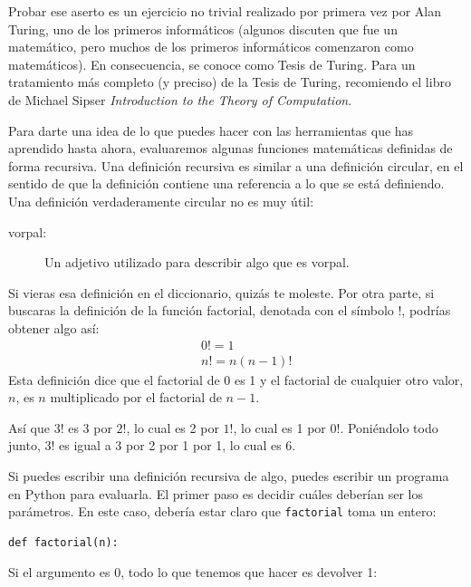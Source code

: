\documentclass[10pt]{book}
\begin{document}
Probar ese aserto es un ejercicio no trivial realizado por primera vez por Alan
Turing, uno de los primeros informáticos (algunos discuten que
fue un matemático, pero muchos de los primeros informáticos comenzaron como
matemáticos).  En consecuencia, se conoce como Tesis de Turing.
Para un tratamiento más completo (y preciso) de la Tesis de Turing,
recomiendo el libro de Michael Sipser {\em Introduction to the
Theory of Computation}.

Para darte una idea de lo que puedes hacer con las herramientas que has aprendido
hasta ahora, evaluaremos algunas funciones matemáticas definidas de forma
recursiva.  Una definición recursiva es similar a una definición
circular, en el sentido de que la definición contiene una referencia a lo que
se está definiendo.  Una definición verdaderamente circular no es muy
útil:

\begin{description}

\item[vorpal:] Un adjetivo utilizado para describir algo que es vorpal.

\end{description}

Si vieras esa definición en el diccionario, quizás te moleste. Por
otra parte, si buscaras la definición de la función
factorial, denotada con el símbolo $!$, podrías obtener algo
así:
%
\begin{eqnarray*}
&&  0! = 1 \\
&&  n! = n (n-1)!
\end{eqnarray*}
%
Esta definición dice que el factorial de 0 es 1 y el factorial de
cualquier otro valor, $n$, es $n$ multiplicado por el factorial de $n-1$.

Así que $3!$ es 3 por $2!$, lo cual es 2 por $1!$, lo cual es 1 por
$0!$. Poniéndolo todo junto, $3!$ es igual a 3 por 2 por 1 por 1,
lo cual es 6.

Si puedes escribir una definición recursiva de algo, puedes
escribir un programa en Python para evaluarla.  El primer paso es decidir
cuáles deberían ser los parámetros.  En este caso, debería estar claro
que {\tt factorial} toma un entero:

\begin{verbatim}
def factorial(n):
\end{verbatim}
%
Si el argumento es 0, todo lo que tenemos que hacer es devolver 1:
\end{document}
